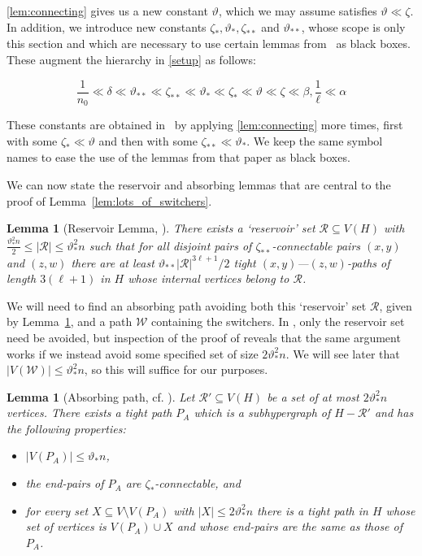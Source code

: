 \documentclass[A4paper,12pt]{article}
\newtheorem{lem}[thm]{Lemma}
\theoremstyle{definition}
\begin{document}
\cref{lem:connecting} gives us a new constant $\vartheta$, which we may assume satisfies $\vartheta \ll \zeta$. In addition, we introduce new constants $\zeta_*, \vartheta_*, \zeta_{**}$ and $\vartheta_{**}$, whose scope is only this section and which are necessary to use certain lemmas from~\cite{3hamcycle} as black boxes. These augment the hierarchy in \cref{setup} as follows:

\[ \frac{1}{n_0} \ll \delta \ll \vartheta_{**} \ll \zeta_{**} \ll \vartheta_* \ll \zeta_* \ll \vartheta \ll  \zeta \ll \beta, \frac{1}{\ell} \ll \alpha \]

These constants are obtained in~\cite{3hamcycle} by applying \cref{lem:connecting} more times, first with some $\zeta_* \ll \vartheta$ and then with some $\zeta_{**} \ll \vartheta_*$. We keep the same symbol names to ease the use of the lemmas from that paper as black boxes. 


We can now state the reservoir and absorbing lemmas that are central to the proof of Lemma~\ref{lem:lots_of_switchers}. 

\begin{lem}[Reservoir Lemma, {\cite[Proposition~$2.7$]{3hamcycle}}]\label{lem:reservoir}
    There exists a `reservoir' set $\mathcal{R} \subseteq V(H)$ with $\frac{\vartheta_{*}^2 n}{2} \leq |\mathcal{R}| \leq \vartheta_{*}^2 n$ such that for all disjoint pairs of $\zeta_{**}$-connectable pairs $(x,y)$ and $(z,w)$ there are at least $\vartheta_{**}|\mathcal{R}|^{3\ell + 1}/2$ tight $(x,y)$---$(z,w)$-paths of length $3(\ell + 1)$ in $H$ whose internal vertices belong to $\mathcal{R}$.
\end{lem}

We will need to find an absorbing path avoiding both this `reservoir' set $\mathcal{R}$, given by Lemma~\ref{lem:reservoir}, and a path $\mathcal{W}$ containing the switchers. In \cite{3hamcycle}, only the reservoir set need be avoided, but inspection of the proof of \cite[Proposition~2.9]{3hamcycle} reveals that the same argument works if we instead avoid some specified set of size $2\vartheta^2_{*} n$. We will see later that $|V(\mathcal{W})| \leq \vartheta^2_{*} n$, so this will suffice for our purposes.

\begin{lem}[Absorbing path, cf. {\cite[Proposition~$2.9$]{3hamcycle}}]\label{lem:absorb}
    Let $\mathcal{R}' \subseteq V(H)$ be a set of at most $2\vartheta^2_{*} n$ vertices. There exists a tight path $P_A$ which is a subhypergraph of $H - \mathcal{R}'$ and has the following properties:
    \begin{itemize}
        \item[(i)] $|V(P_A)| \leq \vartheta_{*}n$,
        \item[(ii)] the end-pairs of $P_A$ are $\zeta_{*}$-connectable, and
        \item[(iii)] for every set $X \subseteq V \setminus V(P_A)$ with $|X| \leq 2\vartheta_{*}^2n$ there is a tight path in $H$ whose set of vertices is $V(P_A) \cup X$ and whose end-pairs are the same as those of $P_A$.
    \end{itemize}
\end{lem}
\end{document}
